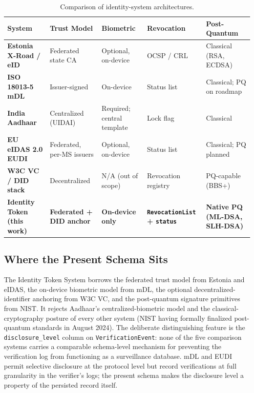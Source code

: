 \documentclass[11pt,letterpaper]{article}
\newcommand{\entity}[1]{\texttt{\color{navydark}#1}}
\newcommand{\thead}[1]{\textbf{\color{white}\small #1}}
\begin{document}
\begin{table}[H]
\centering
\footnotesize
\caption{Comparison of identity-system architectures.}
\setlength{\tabcolsep}{4pt}
\renewcommand{\arraystretch}{1.15}
\begin{tabularx}{\textwidth}{>{\bfseries\RaggedRight\arraybackslash}p{1.4in} >{\RaggedRight\arraybackslash}p{1.05in} >{\RaggedRight\arraybackslash}p{0.95in} >{\RaggedRight\arraybackslash}p{0.95in} >{\RaggedRight\arraybackslash}X}
\toprule
\rowcolor{tabheader}
\thead{System} & \thead{Trust Model} & \thead{Biometric} & \thead{Revocation} & \thead{Post-Quantum} \\
\midrule
Estonia X-Road / eID  & Federated state CA & Optional, on-device & OCSP / CRL & Classical (RSA, ECDSA) \\
ISO 18013-5 mDL       & Issuer-signed & On-device & Status list & Classical; PQ on roadmap \\
India Aadhaar         & Centralized (UIDAI) & Required; central template & Lock flag & Classical \\
EU eIDAS 2.0 EUDI     & Federated, per-MS issuers & Optional, on-device & Status list & Classical; PQ planned \\
W3C VC / DID stack    & Decentralized & N/A (out of scope) & Revocation registry & PQ-capable (BBS+) \\
\midrule
\rowcolor{tabstripe}
\textbf{Identity Token (this work)} & \textbf{Federated + DID anchor} & \textbf{On-device only} & \textbf{\entity{RevocationList} + \texttt{status}} & \textbf{Native PQ (ML-DSA, SLH-DSA)} \\
\bottomrule
\end{tabularx}
\end{table}

\subsection*{Where the Present Schema Sits}

The Identity Token System borrows the federated trust model from Estonia and eIDAS, the on-device biometric model from mDL, the optional decentralized-identifier anchoring from W3C VC, and the post-quantum signature primitives from NIST. It rejects Aadhaar's centralized-biometric model and the classical-cryptography posture of every other system (NIST having formally finalized post-quantum standards in August 2024). The deliberate distinguishing feature is the \texttt{disclosure\_level} column on \entity{VerificationEvent}: none of the five comparison systems carries a comparable schema-level mechanism for preventing the verification log from functioning as a surveillance database. mDL and EUDI permit selective disclosure at the protocol level but record verifications at full granularity in the verifier's logs; the present schema makes the disclosure level a property of the persisted record itself.
\end{document}
